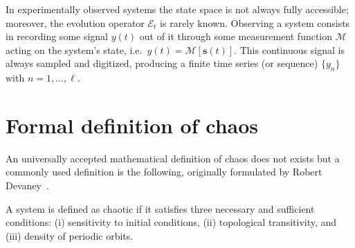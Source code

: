 In experimentally observed systems the state space is not always fully accessible; moreover,
the evolution operator $\mathcal{E}_t$ is rarely known.
Observing a system consists in recording some signal $y(t)$ out of it through some measurement
function $\mathcal{M}$ acting on the system's state, i.e.\ $y(t)=\mathcal{M}[\mathbf{s}(t)]$.
This continuous signal is always sampled and digitized, producing a finite time series (or sequence)
$\{y_n\}$ with $n=1,\ldots,\ell$.


\section{Formal definition of chaos}\label{sec: chaos in theory}

An universally accepted mathematical definition of chaos does not exists but
a commonly used definition is the following, originally formulated by Robert
Devaney~\cite{ref:chaos_definition}.

A system is defined as chaotic if it satisfies three necessary and sufficient conditions: (i) sensitivity to initial conditions, (ii) topological transitivity, and (iii) density of periodic orbits.


